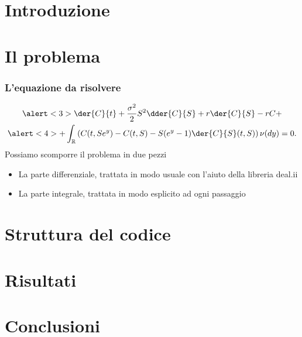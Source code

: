 \documentclass{beamer}
\begin{document}
\section{Introduzione}
\begin{frame}
\end{frame}

\section{Il problema}

\begin{frame}
\frametitle{L'equazione da risolvere}
\begin{multline*}
\alert<3>{\der{C}{t}+\frac{\sigma^2}{2}S^2\dder{C}{S}+r\der{C}{S}-rC+}\\ \alert<4>{+ 
\int_\mathbb{R}\left(C(t,Se^y)-C(t,S)-S(e^y-1)\der{C}{S}(t,S)\right)\nu(dy)}=0.
\end{multline*}
Possiamo scomporre il problema in due pezzi
\begin{itemize}[<+->]
\item La parte differenziale, trattata in modo usuale con l'aiuto della libreria \textsf{deal.ii}
\item La parte integrale, trattata in modo esplicito ad ogni passaggio
\end{itemize}
\end{frame}
\section{Struttura del codice}

\section{Risultati}

\section{Conclusioni}
\end{document}
